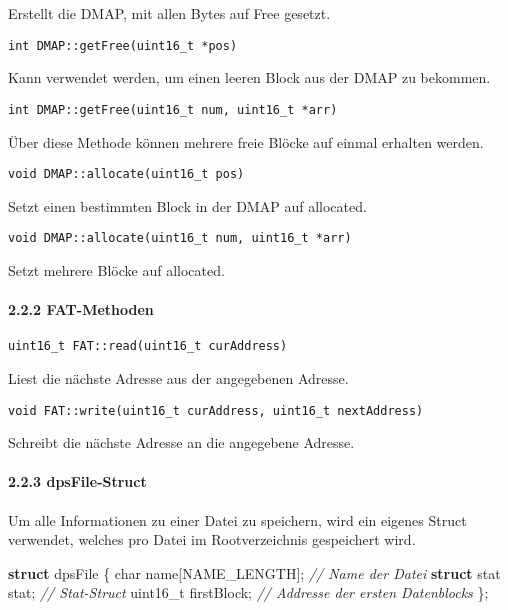 \documentclass[]{article}
\newenvironment{Shaded}{}{}
\newcommand{\CommentTok}[1]{\textcolor[rgb]{0.38,0.63,0.69}{\textit{#1}}}
\newcommand{\DataTypeTok}[1]{\textcolor[rgb]{0.56,0.13,0.00}{#1}}
\newcommand{\KeywordTok}[1]{\textcolor[rgb]{0.00,0.44,0.13}{\textbf{#1}}}
\newcommand{\NormalTok}[1]{#1}
\let\oldparagraph\paragraph
\renewcommand{\paragraph}[1]{\oldparagraph{#1}\mbox{}}
\begin{document}
Erstellt die DMAP, mit allen Bytes auf Free gesetzt.

\texttt{int\ DMAP::getFree(uint16\_t\ *pos)}

Kann verwendet werden, um einen leeren Block aus der DMAP zu bekommen.

\texttt{int\ DMAP::getFree(uint16\_t\ num,\ uint16\_t\ *arr)}

Über diese Methode können mehrere freie Blöcke auf einmal erhalten
werden.

\texttt{void\ DMAP::allocate(uint16\_t\ pos)}

Setzt einen bestimmten Block in der DMAP auf allocated.

\texttt{void\ DMAP::allocate(uint16\_t\ num,\ uint16\_t\ *arr)}

Setzt mehrere Blöcke auf allocated.

\hypertarget{fat-methoden}{%
\paragraph{2.2.2 FAT-Methoden}\label{fat-methoden}}

\texttt{uint16\_t\ FAT::read(uint16\_t\ curAddress)}

Liest die nächste Adresse aus der angegebenen Adresse.

\texttt{void\ FAT::write(uint16\_t\ curAddress,\ uint16\_t\ nextAddress)}

Schreibt die nächste Adresse an die angegebene Adresse.

\hypertarget{dpsfile-struct}{%
\paragraph{2.2.3 dpsFile-Struct}\label{dpsfile-struct}}

Um alle Informationen zu einer Datei zu speichern, wird ein eigenes
Struct verwendet, welches pro Datei im Rootverzeichnis gespeichert wird.

\begin{Shaded}
  \begin{framed}
\begin{Highlighting}[]
\KeywordTok{struct}\NormalTok{ dpsFile \{}
    \DataTypeTok{char}\NormalTok{ name[NAME_LENGTH]; }\CommentTok{// Name der Datei}
    \KeywordTok{struct}\NormalTok{ stat stat;       }\CommentTok{// Stat-Struct}
    \DataTypeTok{uint16_t}\NormalTok{ firstBlock;    }\CommentTok{// Addresse der ersten Datenblocks}
\NormalTok{\};}
\end{Highlighting}
\end{framed}
\end{Shaded}
\end{document}
